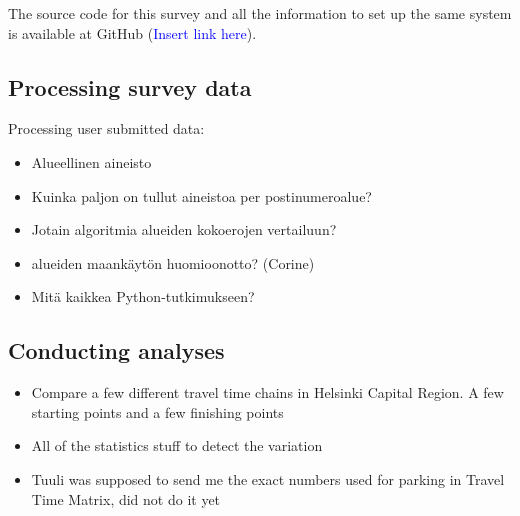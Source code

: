 The source code for this survey and all the information to set up the same system is available at GitHub (\textcolor{blue}{Insert link here}).

\subsection{Processing survey data}
\justify
Processing user submitted data:
\begin{itemize}
  \item Alueellinen aineisto
  \item Kuinka paljon on tullut aineistoa per postinumeroalue?
  \item Jotain algoritmia alueiden kokoerojen vertailuun?
  \item alueiden maankäytön huomioonotto? (Corine)
  \item Mitä kaikkea Python-tutkimukseen?
\end{itemize}

\subsection{Conducting analyses}
\justify
\begin{itemize}
  \item Compare a few different travel time chains in Helsinki Capital Region. A few starting points and a few finishing points
  \item All of the statistics stuff to detect the variation 
  \item Tuuli was supposed to send me the exact numbers used for parking in Travel Time Matrix, did not do it yet
\end{itemize}
